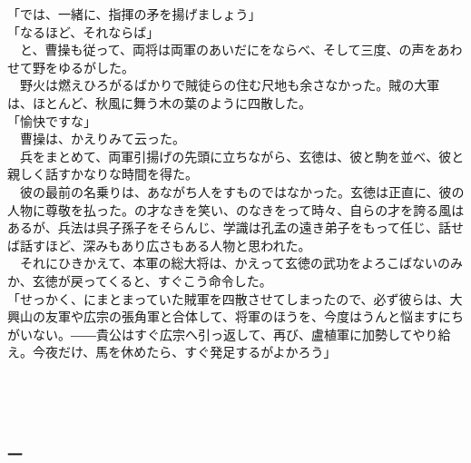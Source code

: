 \documentclass[
  paper=a5,
  fontsize=10pt,
  jafontsize=9.5pt,
  tate,                  %
  open_bracket_pos=nibu, %
]{jlreq}
\begin{document}
「では、一緒に、指揮の矛を揚げましょう」\\


「なるほど、それならば」\\


　と、曹操も従って、両将は両軍のあいだにをならべ、そして三度、の声をあわせて野をゆるがした。\\


　野火は燃えひろがるばかりで賊徒らの住む尺地も余さなかった。賊の大軍は、ほとんど、秋風に舞う木の葉のように四散した。\\


「愉快ですな」\\


　曹操は、かえりみて云った。\\


　兵をまとめて、両軍引揚げの先頭に立ちながら、玄徳は、彼と駒を並べ、彼と親しく話すかなりな時間を得た。\\


　彼の最前の名乗りは、あながち人をすものではなかった。玄徳は正直に、彼の人物に尊敬を払った。の才なきを笑い、のなきをって時々、自らの才を誇る風はあるが、兵法は呉子孫子をそらんじ、学識は孔孟の遠き弟子をもって任じ、話せば話すほど、深みもあり広さもある人物と思われた。\\


　それにひきかえて、本軍の総大将は、かえって玄徳の武功をよろこばないのみか、玄徳が戻ってくると、すぐこう命令した。\\


「せっかく、にまとまっていた賊軍を四散させてしまったので、必ず彼らは、大興山の友軍や広宗の張角軍と合体して、将軍のほうを、今度はうんと悩ますにちがいない。――貴公はすぐ広宗へ引っ返して、再び、盧植軍に加勢してやり給え。今夜だけ、馬を休めたら、すぐ発足するがよかろう」\\

\\

\subsection{}

\\

\subsubsection{一}
\end{document}
